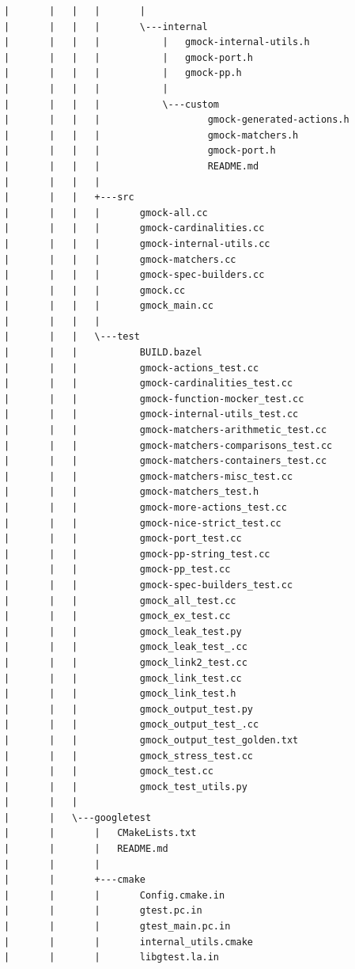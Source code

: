 \documentclass[12pt,a4paper]{article}
\begin{document}
\begin{verbatim}
|       |   |   |       |   
|       |   |   |       \---internal
|       |   |   |           |   gmock-internal-utils.h
|       |   |   |           |   gmock-port.h
|       |   |   |           |   gmock-pp.h
|       |   |   |           |   
|       |   |   |           \---custom
|       |   |   |                   gmock-generated-actions.h
|       |   |   |                   gmock-matchers.h
|       |   |   |                   gmock-port.h
|       |   |   |                   README.md
|       |   |   |                   
|       |   |   +---src
|       |   |   |       gmock-all.cc
|       |   |   |       gmock-cardinalities.cc
|       |   |   |       gmock-internal-utils.cc
|       |   |   |       gmock-matchers.cc
|       |   |   |       gmock-spec-builders.cc
|       |   |   |       gmock.cc
|       |   |   |       gmock_main.cc
|       |   |   |       
|       |   |   \---test
|       |   |           BUILD.bazel
|       |   |           gmock-actions_test.cc
|       |   |           gmock-cardinalities_test.cc
|       |   |           gmock-function-mocker_test.cc
|       |   |           gmock-internal-utils_test.cc
|       |   |           gmock-matchers-arithmetic_test.cc
|       |   |           gmock-matchers-comparisons_test.cc
|       |   |           gmock-matchers-containers_test.cc
|       |   |           gmock-matchers-misc_test.cc
|       |   |           gmock-matchers_test.h
|       |   |           gmock-more-actions_test.cc
|       |   |           gmock-nice-strict_test.cc
|       |   |           gmock-port_test.cc
|       |   |           gmock-pp-string_test.cc
|       |   |           gmock-pp_test.cc
|       |   |           gmock-spec-builders_test.cc
|       |   |           gmock_all_test.cc
|       |   |           gmock_ex_test.cc
|       |   |           gmock_leak_test.py
|       |   |           gmock_leak_test_.cc
|       |   |           gmock_link2_test.cc
|       |   |           gmock_link_test.cc
|       |   |           gmock_link_test.h
|       |   |           gmock_output_test.py
|       |   |           gmock_output_test_.cc
|       |   |           gmock_output_test_golden.txt
|       |   |           gmock_stress_test.cc
|       |   |           gmock_test.cc
|       |   |           gmock_test_utils.py
|       |   |           
|       |   \---googletest
|       |       |   CMakeLists.txt
|       |       |   README.md
|       |       |   
|       |       +---cmake
|       |       |       Config.cmake.in
|       |       |       gtest.pc.in
|       |       |       gtest_main.pc.in
|       |       |       internal_utils.cmake
|       |       |       libgtest.la.in

\end{verbatim}
\end{document}
